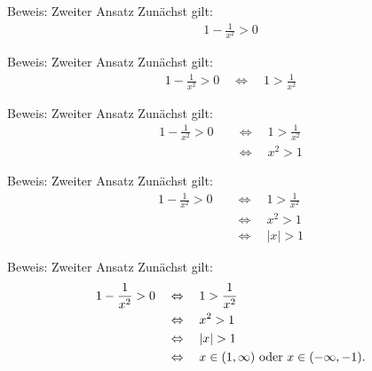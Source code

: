 \documentclass[10pt]{beamer}
\begin{document}
\begin{frame}{Beweis: Zweiter Ansatz}
    Zunächst gilt:
    \begin{align*}
        1 - \frac{1}{x^{2}} > 0
    \end{align*}
\end{frame}



\begin{frame}{Beweis: Zweiter Ansatz}
    Zunächst gilt:
    \begin{align*}
        1 - \frac{1}{x^{2}} > 0 
        \quad \Leftrightarrow \quad 1 > \frac{1}{x^{2}} 
    \end{align*}
\end{frame}



\begin{frame}{Beweis: Zweiter Ansatz}
    Zunächst gilt:
    \begin{align*}
        1 - \frac{1}{x^{2}} > 0 
        \quad & \Leftrightarrow \quad 1 > \frac{1}{x^{2}} \\
        \quad & \Leftrightarrow \quad x^{2} > 1 
    \end{align*}
\end{frame}



\begin{frame}{Beweis: Zweiter Ansatz}
    Zunächst gilt:
    \begin{align*}
        1 - \frac{1}{x^{2}} > 0 
        \quad & \Leftrightarrow \quad 1 > \frac{1}{x^{2}} \\
        \quad & \Leftrightarrow \quad x^{2} > 1 \\
        \quad & \Leftrightarrow \quad \left\vert x \right\vert > 1
    \end{align*}
\end{frame}



\begin{frame}{Beweis: Zweiter Ansatz}
    Zunächst gilt:
    \begin{align*}
        1 - \frac{1}{x^{2}} > 0 
        \quad & \Leftrightarrow \quad 1 > \frac{1}{x^{2}} \\
        \quad & \Leftrightarrow \quad x^{2} > 1 \\
        \quad & \Leftrightarrow \quad \left\vert x \right\vert > 1 \\
        \quad & \Leftrightarrow \quad \text{\( x \in \left(1, \infty \right)  \) oder \( x \in \left(- \infty, -1 \right) \)}.  
    \end{align*}
\end{frame}
\end{document}
